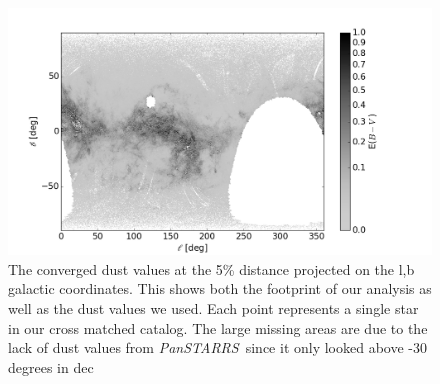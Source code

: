 \documentclass[modern]{aastex61}
\newcommand{\acronym}[1]{{\small{#1}}}
\newcommand{\project}[1]{\textsl{#1}}
\newcommand{\panstarrs}{\project{Pan\acronym{STARRS}}}
\begin{document}
\begin{figure}
\centering
  \includegraphics[width=\textwidth]{dust.png}
\caption{The converged dust values at the 5\% distance projected on the l,b galactic coordinates. This shows both the footprint of our analysis as well as the dust values we used. Each point represents a single star in our cross matched catalog. The large missing areas are due to the lack of dust values from \panstarrs\ since it only looked above -30 degrees in dec }
\label{fig:dust}
\end{figure}
\end{document}
